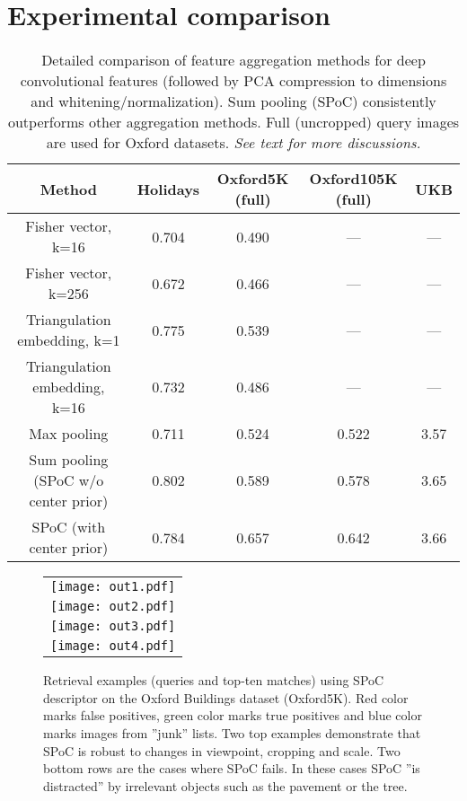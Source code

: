 \section{Experimental comparison}

\begin{table*}
\centering
\begin{tabular}{|c|c|c|c|c|}
\hline
Method & Holidays & Oxford5K (full) & Oxford105K (full) & UKB\\
\hline
Fisher vector, k=16 & 0.704 & 0.490 & --- & ---\\
\hline
Fisher vector, k=256 & 0.672 & 0.466 & --- & ---\\
\hline
Triangulation embedding, k=1 & 0.775 & 0.539 & --- & ---\\
\hline
Triangulation embedding, k=16 & 0.732 & 0.486 & --- & ---\\
\hline
Max pooling  & 0.711 & 0.524 & 0.522 & 3.57\\
\hline
Sum pooling (SPoC w/o center prior) & 0.802 & 0.589 & 0.578 & 3.65\\
SPoC (with center prior) & 0.784 & 0.657 & 0.642 & 3.66\\
\hline
\end{tabular}
\vspace{1mm}

\caption{ Detailed comparison of feature aggregation methods for deep convolutional features (followed by PCA compression to  dimensions and whitening/normalization).
Sum pooling (SPoC) consistently outperforms other aggregation methods. Full (uncropped) query images are used for Oxford datasets.
\textit{See text for more discussions.}}
\label{tab:mainComparison}
\end{table*}

\begin{figure*}
\centering
\begin{tabular}{c}
\texttt{[image: out1.pdf]}\\
\texttt{[image: out2.pdf]}\\
\texttt{[image: out3.pdf]}\\
\texttt{[image: out4.pdf]}
\end{tabular}
\caption{Retrieval examples (queries and top-ten matches) using SPoC descriptor on the Oxford Buildings dataset (Oxford5K). Red color marks false positives, green color marks true positives and blue color marks images from ''junk'' lists. Two top examples demonstrate that SPoC is robust to changes in viewpoint, cropping and scale. Two bottom rows are the cases where SPoC fails. In these cases SPoC ''is distracted'' by irrelevant objects such as the pavement or the tree.}
\label{fig:examples}
\vspace{-3mm}
\end{figure*}

